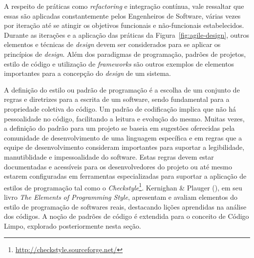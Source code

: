 A respeito de práticas como \emph{refactoring} e integração contínua, vale ressaltar que essas são aplicadas constantemente pelos Engenheiros de Software, várias vezes por iteração até se atingir os objetivos funcionais e não-funcionais estabelecidos.
%
Durante as iterações e a aplicação das práticas da Figura~\ref{fig:agile-design}, outros elementos e técnicas de \emph{design} devem ser considerados para se aplicar os princípios de \emph{design}.
%
Além dos paradigmas de programação, padrões de projetos, estilo de código e utilização de \emph{frameworks} são outros exemplos de elementos importantes para a concepção do \emph{design} de um sistema.



A definição do estilo ou padrão de programação é a escolha de um conjunto de regras e diretrizes para a escrita de um software, sendo fundamental para a propriedade coletiva do código.
%
Um padrão de codificação implica que não há pessoalidade no código, facilitando a leitura e evolução do mesmo.
%
Muitas vezes, a definição do padrão para um projeto se baseia em sugestões oferecidas pela comunidade de desenvolvimento de uma linguagem específica e em regras que a equipe de desenvolvimento consideram importantes para suportar a legibilidade, manutiblidade e impessoalidade do software.
%
Estas regras devem estar documentadas e acessíveis para os desenvolvedores do projeto ou até mesmo estarem configuradas em ferramentas especializadas para suportar a aplicação de estilos de programação tal como o \emph{Checkstyle}\footnote{\url{http://checkstyle.sourceforge.net/}}.
%
Kernighan \& Plauger (\citeyear{kernighan1978}), em seu livro \emph{The Elements of Programming Style}, apresentam e avaliam elementos do estilo de programação de softwares reais, destacando lições aprendidas na análise dos códigos.
%
A noção de padrões de código é extendida para o conceito de Código Limpo, explorado posteriormente nesta seção.


